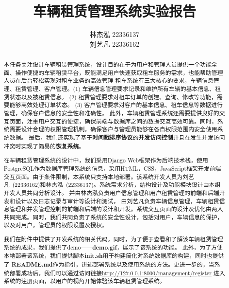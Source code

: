 \documentclass[UTF8,a4paper,12pt]{ctexart}
\title{\textbf{\Large{车辆租赁管理系统实验报告}}}
\author{ 林杰泓 22336137 \\刘艺凡 22336162}
\begin{document}
 
\maketitle

\begin{abstract}
本任务关注设计车辆租赁管理系统，设计目的在于为用户和管理人员提供一个功能全面、操作便捷的车辆租赁平台，既能满足用户快速获取租车服务的需求，也能帮助管理人员在后台轻松实现对租车业务的高效管理
租车系统有三大核心的要求，车辆信息管理、租赁管理、客户管理。(1) 车辆信息管理要求记录和维护所有车辆的基本信息、租赁状态以及被租赁信息。 (2) 租赁管理要求对租车订单的创建、查询、修改等功能，需要能够高效处理订单状态。 (3) 客户管理要求对客户的基本信息、租车信息等数据进行管理，确保客户信息的安全性和准确性。
此外，车辆租赁管理系统还需要提供良好的交互页面，注重用户交互的便捷，确保前端与数据库之间的数据交互高效可靠。同时，系统需要设计合理的权限管理机制，确保客户与管理员能够在各自权限范围内安全使用系统数据。
最后，我们还实现了基于\textbf{时间戳排序协议}的\textbf{并发访问控制}并且在发生并发访问冲突时实现了简易的\textbf{恢复系统}。

在车辆租赁管理系统的设计中，我们采用Django Web框架作为后端技术栈，使用PostgreSQL作为数据库管理系统的信息，采用HTML，CSS，JavaScript框架开发前端交互页面。由于条件限制，本系统只支持本地部署。该系统开发人员为刘艺凡~(22336162)和林杰泓~(22336137)。系统需求分析，结构设计及功能模块设计由本组开发人员共同分析设计。
并由林杰泓负责用户信息管理和用户租赁管理的前端和后端开发和设计以及日志记录与审计等设计和测试，
由刘艺凡负责车辆信息管理，车辆租赁信息管理和并发管理控制的前端和后端的设计和开发。系统交互页面的设计及优化由两人共同完成。同时，我们共同负责了系统的安全性设计，包括对用户，车辆信息的保护，以及对用户，管理员的权限设置及授权。

我们在附件中提供了开发系统的相关代码。同时，为了便于查看和了解该车辆租赁管理系统的成果，我们提供了demo——\textbf{demo.gif}，展示了该系统的功能。
此外，为了方便本地部署该系统，我们提供脚本\textbf{init.sh}用于构建简化对系统数据库的构建，同时也提供了 \textbf{README.md}作为指引，讲述部署系统以及使用系统的方法。更进一步的，当系统部署成功后，我们可以通过访问链接\href{http://127.0.0.1:8000/management/register}{http://127.0.0.1:8000/management/register} 进入系统的注册页面，以用户的视角开始体验该车辆租赁管理系统。

\end{abstract}

 
 
\end{document}
